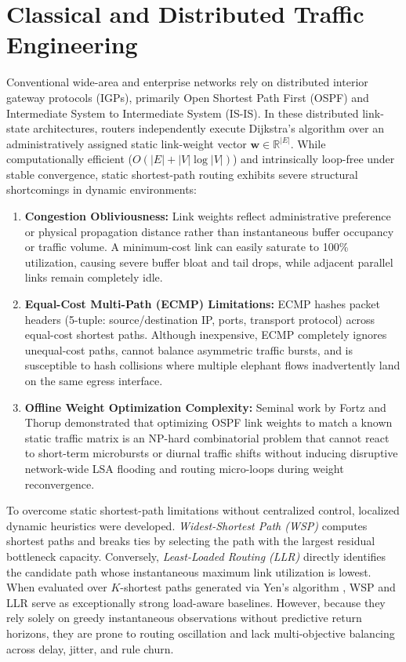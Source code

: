 \documentclass[12pt,a4paper,oneside]{report}
\begin{document}
\section{Classical and Distributed Traffic Engineering}
\label{sec:lit_classical}
Conventional wide-area and enterprise networks rely on distributed interior gateway protocols (IGPs), primarily Open Shortest Path First (OSPF) \cite{moy1998ospf} and Intermediate System to Intermediate System (IS-IS). In these distributed link-state architectures, routers independently execute Dijkstra's algorithm \cite{dijkstra1959note} over an administratively assigned static link-weight vector $\mathbf{w} \in \mathbb{R}^{|E|}$. While computationally efficient ($O(|E| + |V| \log |V|)$) and intrinsically loop-free under stable convergence, static shortest-path routing exhibits severe structural shortcomings in dynamic environments:
\begin{enumerate}
  \item \textbf{Congestion Obliviousness:} Link weights reflect administrative preference or physical propagation distance rather than instantaneous buffer occupancy or traffic volume. A minimum-cost link can easily saturate to 100\% utilization, causing severe buffer bloat and tail drops, while adjacent parallel links remain completely idle.
  \item \textbf{Equal-Cost Multi-Path (ECMP) Limitations:} ECMP hashes packet headers (5-tuple: source/destination IP, ports, transport protocol) across equal-cost shortest paths. Although inexpensive, ECMP completely ignores unequal-cost paths, cannot balance asymmetric traffic bursts, and is susceptible to hash collisions where multiple elephant flows inadvertently land on the same egress interface.
  \item \textbf{Offline Weight Optimization Complexity:} Seminal work by Fortz and Thorup \cite{fortz2000internet,fortz2002optimizing} demonstrated that optimizing OSPF link weights to match a known static traffic matrix is an NP-hard combinatorial problem that cannot react to short-term microbursts or diurnal traffic shifts without inducing disruptive network-wide LSA flooding and routing micro-loops during weight reconvergence.
\end{enumerate}

To overcome static shortest-path limitations without centralized control, localized dynamic heuristics were developed. \emph{Widest-Shortest Path (WSP)} computes shortest paths and breaks ties by selecting the path with the largest residual bottleneck capacity. Conversely, \emph{Least-Loaded Routing (LLR)} directly identifies the candidate path whose instantaneous maximum link utilization is lowest. When evaluated over $K$-shortest paths generated via Yen's algorithm \cite{yen1971finding}, WSP and LLR serve as exceptionally strong load-aware baselines. However, because they rely solely on greedy instantaneous observations without predictive return horizons, they are prone to routing oscillation and lack multi-objective balancing across delay, jitter, and rule churn.
\end{document}
